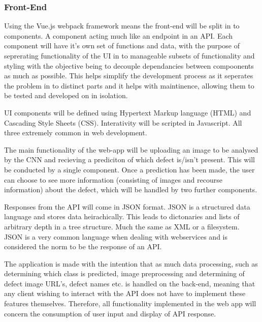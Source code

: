     \subsubsection{Front-End}
      Using the Vue.js webpack framework means the front-end will be split in to components. A component acting much like an endpoint in an API. Each component will have it's own set of functions and data, with the purpose of seprerating functionality of the UI in to manageable subsets of functionality and styling with the objective being to decouple dependancies between compoonents as much as possible. This helps simplify the development process as it seperates the problem in to distinct parts and it helps with maintinence, allowing them to be tested and developed on in isolation.
      \par
      UI components will be defined using Hypertext Markup language (HTML) and Cascading Style Sheets (CSS). Interativity will be scripted in Javascript. All three extremely common in web development. %
      \par
      The main functionality of the web-app will be uploading an image to be analysed by the CNN and recieving a prediciton of which defect is/isn't present. This will be conducted by a single component. Once a prediction has been made, the user can choose to see more information (consisting of images and recourse information) about the defect, which will be handled by two further components.
      \par
      Responses from the API will come in JSON format. JSON is a structured data language and stores data heirachically. This leads to dictonaries and lists of arbitrary depth in a tree structure. Much the same as XML or a filesystem. JSON is a very common language when dealing with webservices and is considered the norm to be the response of an API.
      \par
      The application is made with the intention that as much data processing, such as determining which class is predicted, image preprocessing and determining of defect image URL's, defect names etc. is handled on the back-end, meaning that any client wishing to interact with the API does not have to implement these features themselves. Therefore, all functionality implemented in the web app will concern the consumption of user input and display of API response.
      \par
